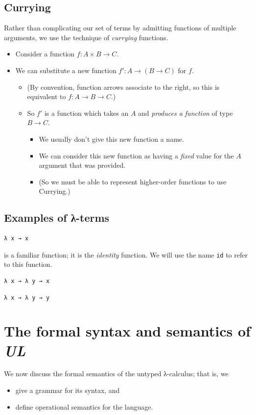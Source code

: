 \documentclass[11pt]{article}
\theoremstyle{definition}
\begin{document}
\subsection{Currying}
\label{sec:orge26f12d}
Rather than complicating our set of terms by admitting
functions of multiple arguments, we use the technique
of \emph{currying} functions.
\begin{itemize}
\item Consider a function \(f : A × B → C\).
\item We can substitute a new function \(f′ : A → (B → C)\)
for \(f\).
\begin{itemize}
\item (By convention, function arrows associate to the right,
so this is equivalent to \(f : A → B → C\).)
\item So \(f′\) is a function which takes an \(A\) and
\emph{produces a function} of type \(B → C\).
\begin{itemize}
\item We usually don't give this new function a name.
\item We can consider this new function as having a \emph{fixed} value
for the \(A\) argument that was provided.
\item (So we must be able to represent higher-order functions
to use Currying.)
\end{itemize}
\end{itemize}
\end{itemize}

\subsection{Examples of λ-terms}
\label{sec:org5c16ce4}
\begin{verbatim}
λ x → x
\end{verbatim}
is a familiar function; it is the \emph{identity} function.
We will use the name \texttt{id} to refer to this function.

\begin{verbatim}
λ x → λ y → x
\end{verbatim}

\begin{verbatim}
λ x → λ y → y
\end{verbatim}

\section{The formal syntax and semantics of \emph{UL}}
\label{sec:org59061b7}
We now discuss the formal semantics of the untyped λ-calculus;
that is, we
\begin{itemize}
\item give a grammar for its syntax, and
\item define operational semantics for the language.
\end{itemize}
\end{document}
